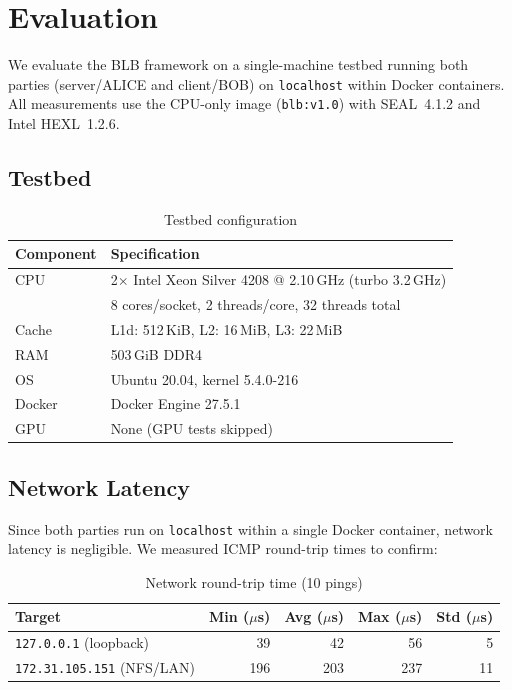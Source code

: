 \section{Evaluation}\label{sec:evaluation}

We evaluate the BLB framework on a single-machine testbed running both parties (server/ALICE and client/BOB) on \texttt{localhost} within Docker containers.
All measurements use the CPU-only image (\texttt{blb:v1.0}) with SEAL~4.1.2 and Intel HEXL~1.2.6.

\subsection{Testbed}

\begin{table}[h]
\centering
\caption{Testbed configuration}
\label{tab:testbed}
\begin{tabular}{ll}
\toprule
Component & Specification \\
\midrule
CPU       & 2$\times$ Intel Xeon Silver 4208 @ 2.10\,GHz (turbo 3.2\,GHz) \\
          & 8 cores/socket, 2 threads/core, 32 threads total \\
Cache     & L1d: 512\,KiB, L2: 16\,MiB, L3: 22\,MiB \\
RAM       & 503\,GiB DDR4 \\
OS        & Ubuntu 20.04, kernel 5.4.0-216 \\
Docker    & Docker Engine 27.5.1 \\
GPU       & None (GPU tests skipped) \\
\bottomrule
\end{tabular}
\end{table}

\subsection{Network Latency}

Since both parties run on \texttt{localhost} within a single Docker container, network latency is negligible.
We measured ICMP round-trip times to confirm:

\begin{table}[h]
\centering
\caption{Network round-trip time (10 pings)}
\label{tab:ping}
\begin{tabular}{lrrrr}
\toprule
Target & Min ($\mu$s) & Avg ($\mu$s) & Max ($\mu$s) & Std ($\mu$s) \\
\midrule
\texttt{127.0.0.1} (loopback) & 39 & 42 & 56 & 5 \\
\texttt{172.31.105.151} (NFS/LAN) & 196 & 203 & 237 & 11 \\
\bottomrule
\end{tabular}
\end{table}


